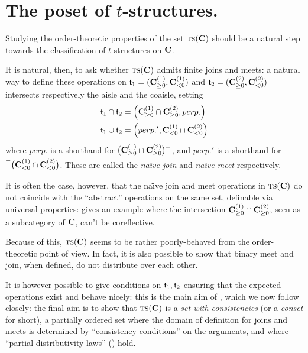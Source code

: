 \section{The poset of $t$\hyp{}structures.}
Studying the order\hyp{}theoretic properties of the set $\text{\scshape ts}(\mathbf{C})$ should be a natural step towards the classification of $t$\hyp{}structures on $\mathbf{C}$.

It is natural, then, to ask whether $\text{\scshape ts}(\mathbf{C})$ admits finite joins and meets: a natural way to define these operations on $\mathfrak{t}_1 = (\mathbf{C}_{\ge 0}^{(1)}, \mathbf{C}_{<0}^{(1)})$ and $\mathfrak{t}_2=(\mathbf{C}_{\ge 0}^{(2)}, \mathbf{C}_{<0}^{(2)})$ intersects respectively the aisle and the coaisle, setting
\begin{align}
\mathfrak{t}_1\cap \mathfrak{t}_2 &= \Big(\mathbf{C}_{\ge 0}^{(1)}\cap \mathbf{C}_{\ge 0}^{(2)}, perp.\Big)\label{naivemeet}\\
\mathfrak{t}_1\cup \mathfrak{t}_2 &= \Big(perp.', \mathbf{C}_{< 0}^{(1)}\cap \mathbf{C}_{< 0}^{(2)}\Big)\label{naivejoin}
\end{align}
where $perp.$ is a shorthand for $\big(\mathbf{C}_{\ge 0}^{(1)}\cap \mathbf{C}_{\ge 0}^{(2)}\big)^\perp$, and $perp.'$ is a shorthand for $\prescript{\perp}{}{\big(\mathbf{C}_{< 0}^{(1)}\cap \mathbf{C}_{< 0}^{(2)}\big)}$. These are called the \emph{na\"{\i}ve join} and \emph{na\"{\i}ve meet} respectively.

It is often the case, however, that the na\"{\i}ve join and meet operations in $\text{\scshape ts}(\mathbf{C})$ do not coincide with the ``abstract'' operations on the same set, definable via universal properties: \cite[\S\textbf{1.2}]{bondal2013operations} gives an example where the intersection $\mathbf{C}_{\ge 0}^{(1)}\cap \mathbf{C}_{\ge 0}^{(2)}$, seen as a subcategory of $\mathbf{C}$, can't be coreflective.

Because of this, $\text{\scshape ts}(\mathbf{C})$ seems to be rather poorly\hyp{}behaved from the order\hyp{}theoretic point of view. In fact, it is also possible to show that binary meet and join, when defined, do not distribute over each other.

It is however possible to give conditions on $\mathfrak{t}_1,\mathfrak{t}_2$ ensuring that the expected operations exist and behave nicely: this is the main aim of \cite{bondal2013operations}, which we now follow closely: the final aim is to show that $\text{\scshape ts}(\mathbf{C})$ is a \emph{set with consistencies}  (or a \emph{conset} for short), \ie a partially ordered set where the domain of definition for joins and meets is determined by ``consistency conditions'' on the arguments, and where ``partial distributivity laws'' (\cite[\S 2.1]{bondal2013operations}) hold.

